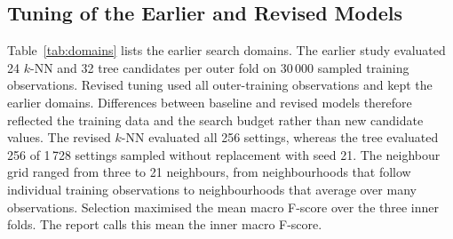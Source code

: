 \documentclass[conference]{IEEEtran}
\newcommand{\knn}{\mbox{$k$-NN}}
\begin{document}
\subsection{Tuning of the Earlier and Revised Models}
Table~\ref{tab:domains} lists the earlier search domains. The earlier study evaluated 24 \knn{} and 32 tree candidates per outer fold on 30\,000 sampled training observations. Revised tuning used all outer-training observations and kept the earlier domains. Differences between baseline and revised models therefore reflected the training data and the search budget rather than new candidate values. The revised \knn{} evaluated all 256 settings, whereas the tree evaluated 256 of 1\,728 settings sampled without replacement with seed 21. The neighbour grid ranged from three to 21 neighbours, from neighbourhoods that follow individual training observations to neighbourhoods that average over many observations. Selection maximised the mean macro F-score over the three inner folds. The report calls this mean the inner macro F-score.
\end{document}
